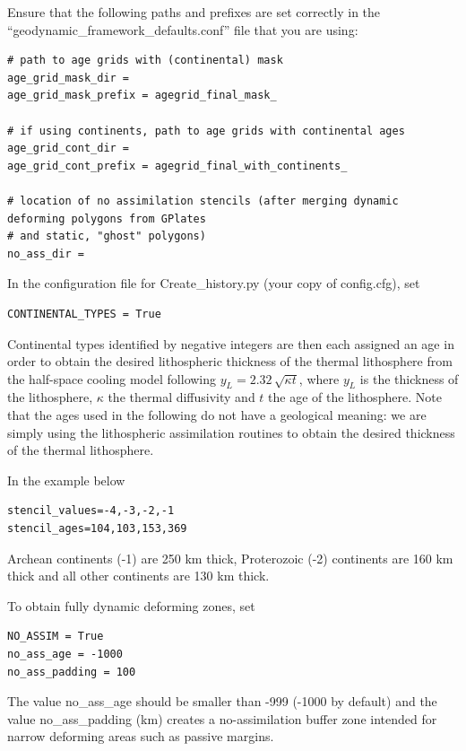 \documentclass[letterpaper,12pt]{article}
\begin{document}
Ensure that the following paths and prefixes are set correctly in the ``geodynamic\_framework\_defaults.conf'' file that you are using:

\begin{verbatim}
# path to age grids with (continental) mask
age_grid_mask_dir =
age_grid_mask_prefix = agegrid_final_mask_

# if using continents, path to age grids with continental ages
age_grid_cont_dir =
age_grid_cont_prefix = agegrid_final_with_continents_

# location of no assimilation stencils (after merging dynamic deforming polygons from GPlates
# and static, "ghost" polygons)
no_ass_dir =
\end{verbatim}

In the configuration file for Create\_history.py (your copy of config.cfg), set

\begin{verbatim}
CONTINENTAL_TYPES = True
\end{verbatim}

Continental types identified by negative integers are then each assigned an age in order to obtain the desired lithospheric thickness of the thermal lithosphere from the half-space cooling model following $y_L = 2.32\,\sqrt{\kappa t}$, where $y_L$ is the thickness of the lithosphere, $\kappa$ the thermal diffusivity and $t$ the age of the lithosphere.
Note that the ages used in the following do not have a geological meaning: we are simply using the lithospheric assimilation routines to obtain the desired thickness of the thermal lithosphere.

In the example below
\begin{verbatim}
stencil_values=-4,-3,-2,-1
stencil_ages=104,103,153,369
\end{verbatim}

Archean continents (-1) are 250 km thick, Proterozoic (-2) continents are 160 km thick and all other continents are 130 km thick.

To obtain fully dynamic deforming zones, set 

\begin{verbatim}
NO_ASSIM = True
no_ass_age = -1000
no_ass_padding = 100
\end{verbatim}

The value no\_ass\_age should be smaller than -999 (-1000 by default) and the value no\_ass\_padding (km) creates a no-assimilation buffer zone intended for narrow deforming areas such as passive margins.
\end{document}
